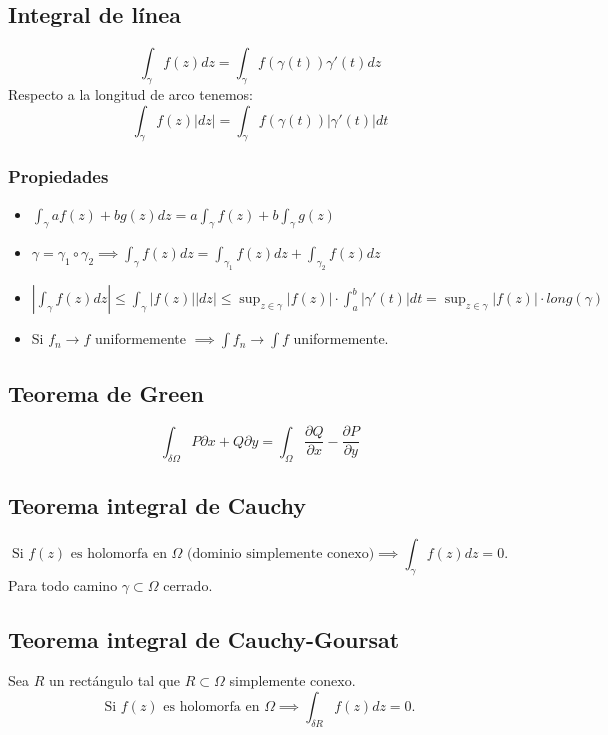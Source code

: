 \documentclass[paper=a4, fontsize=11pt]{scrartcl}
\numberwithin{equation}{section}
\numberwithin{figure}{section}
\numberwithin{table}{section}
\begin{document}
\subsection{Integral de línea}
$$\int_\gamma f(z)dz = \int_\gamma f(\gamma(t))\gamma'(t)dz$$
Respecto a la longitud de arco tenemos:
$$\int_\gamma f(z)|dz| = \int_\gamma f(\gamma(t))|\gamma'(t)|dt$$
\subsubsection{Propiedades}
\begin{itemize}
\item $\int_\gamma af(z)+bg(z)dz = a\int_\gamma f(z) + b\int_\gamma g(z)$
\item $\gamma = \gamma_1 \circ \gamma_2 \implies \int_\gamma f(z)dz = \int_{\gamma_1} f(z)dz + \int_{\gamma_2} f(z)dz$
\item $\boxed{\left|\int_\gamma f(z)dz\right| \le \int_\gamma |f(z)||dz| \le \sup_{z\in\gamma}\left|f(z)\right|\cdot \int_a^b|\gamma'(t)|dt = \sup_{z\in\gamma}\left|f(z)\right|\cdot long(\gamma)}$
\item Si ${f_n}\to f$ uniformemente $\implies \int f_n \to \int f$ uniformemente.
\end{itemize}

\subsection{Teorema de Green}
$$\int_{\delta\Omega} P \partial x+Q\partial y = \int_\Omega \frac{\partial Q}{\partial x} - \frac{\partial P}{\partial y} $$

\subsection{Teorema integral de Cauchy}
$$\text{Si }f(z)\text{ es holomorfa en }\Omega\text{ (dominio simplemente conexo)} \implies \int_{\gamma} f(z)dz = 0.$$ Para todo camino $\gamma\subset\Omega$ cerrado.

\subsection{Teorema integral de Cauchy-Goursat}
Sea $R$ un rectángulo tal que $R\subset\Omega$ simplemente conexo.
$$\text{Si }f(z)\text{ es holomorfa en }\Omega \implies \int_{\delta R} f(z)dz = 0.$$
\end{document}

